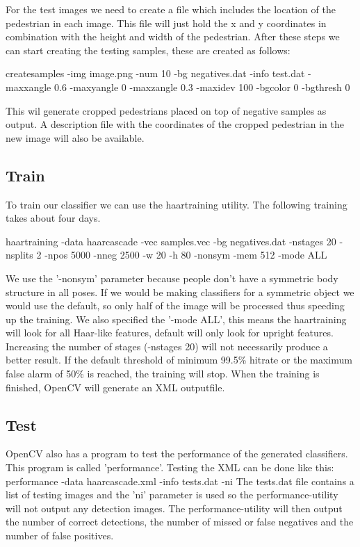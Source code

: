 \documentclass{article}
\begin{document}
For the test images we need to create a file which includes the location of the pedestrian in each image. This file will just hold the x and y coordinates in combination with the height and width of the pedestrian.
After these steps we can start creating the testing samples, these are created as follows:

createsamples -img image.png -num 10 -bg negatives.dat -info test.dat -maxxangle 0.6 -maxyangle 0 -maxzangle 0.3 -maxidev 100 -bgcolor 0 -bgthresh 0

This wil generate cropped pedestrians placed on top of negative samples as output. A description file with the coordinates of the cropped pedestrian in the new image will also be available.




\subsection{Train}

To train our classifier we can use the haartraining utility. The following training takes about four days.

haartraining -data haarcascade -vec samples.vec -bg negatives.dat -nstages 20 -nsplits 2 -npos 5000 -nneg 2500 -w 20 -h 80 -nonsym -mem 512 -mode ALL

We use the '-nonsym' parameter because people don't have a symmetric body structure in all poses. If we would be making classifiers for a symmetric object we would use the default, so only half of the image will be processed  thus speeding up the training. We also specified the '-mode ALL', this means the haartraining will look for all Haar-like features, default will only look for upright features.
Increasing the number of stages (-nstages 20) will not necessarily produce a better result. If the default threshold of minimum 99.5\% hitrate or the maximum false alarm of 50\% is reached, the training will stop.
When the training is finished, OpenCV will generate an XML outputfile.

\subsection{Test}
OpenCV also has a program to test the performance of the generated classifiers. This program is called 'performance'. Testing the XML can be done like this:
performance -data haarcascade.xml -info tests.dat -ni
The tests.dat file contains a list of testing images and the 'ni' parameter is used so the performance-utility will not output any detection images.
The performance-utility will then output the number of correct detections, the number of missed or false negatives and the number of false positives.
\end{document}
